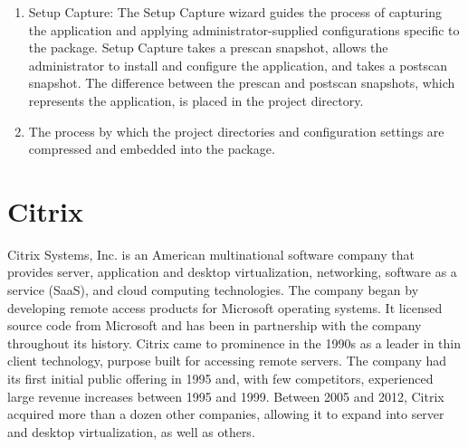 \begin{itemize}
\begin{enumerate}
\begin{enumerate}
\item Setup Capture: The Setup Capture wizard guides the process of capturing the application and applying administrator-supplied configurations specific to the package. Setup Capture takes a prescan snapshot, allows the administrator to install and configure the application, and takes a postscan snapshot. The difference between the prescan and postscan snapshots, which represents the application, is placed in the project directory.
\item The process by which the project directories and configuration settings are compressed and embedded into the package.
\end{enumerate}
\end{enumerate}

\section{Citrix}
Citrix Systems, Inc. is an American multinational software company that provides server, application and desktop virtualization, networking, software as a service (SaaS), and cloud computing technologies. The company began by developing remote access products for Microsoft operating systems. It licensed source code from Microsoft and has been in partnership with the company throughout its history. Citrix came to prominence in the 1990s as a leader in thin client technology, purpose built for accessing remote servers. The company had its first initial public offering in 1995 and, with few competitors, experienced large revenue increases between 1995 and 1999. Between 2005 and 2012, Citrix acquired more than a dozen other companies, allowing it to expand into server and desktop virtualization, as well as others.


\end{itemize}
